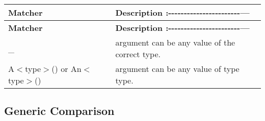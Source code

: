 \tabulinesep=1mm
\begin{longtabu} spread 0pt [c]{*{2}{|X[-1]}|}
\hline
\rowcolor{\tableheadbgcolor}\textbf{ Matcher  }&\textbf{ Description \+:-\/-\/-\/-\/-\/-\/-\/-\/-\/-\/-\/-\/-\/-\/-\/-\/-\/-\/-\/-\/-\/-\/-\/---   }\\
\endfirsthead
\hline
\endfoot
\hline
\rowcolor{\tableheadbgcolor}\textbf{ Matcher  }&\textbf{ Description \+:-\/-\/-\/-\/-\/-\/-\/-\/-\/-\/-\/-\/-\/-\/-\/-\/-\/-\/-\/-\/-\/-\/-\/---   }\\
\endhead
{\ttfamily \+\_\+}  &{\ttfamily argument} can be any value of the correct type.   \\
{\ttfamily A$<$type$>$()} or {\ttfamily An$<$type$>$()}  &{\ttfamily argument} can be any value of type {\ttfamily type}.   \\
\end{longtabu}


\subsection*{Generic Comparison}


